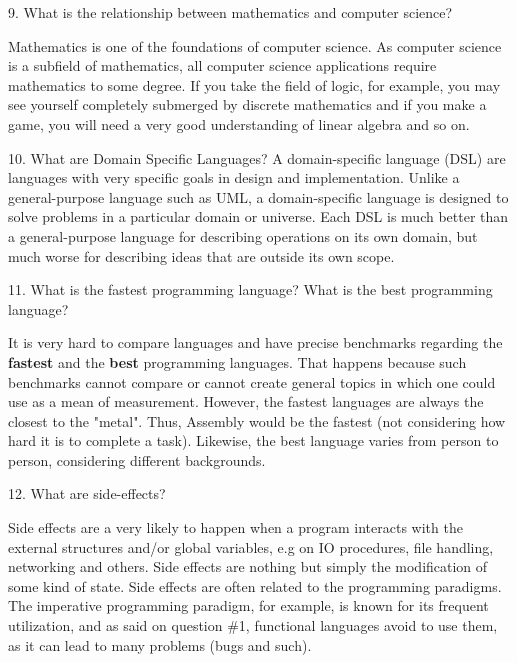\documentclass{article}
\begin{document}
9. What is the relationship between mathematics and computer science?
\newline

Mathematics is one of the foundations of computer science. As computer science is a subfield of mathematics, all computer science applications require mathematics to some degree. If you take the field of logic, for example, you may see yourself completely submerged by discrete mathematics and if you make a game, you will need a very good understanding of linear algebra and so on.
\newline

10. What are Domain Specific Languages?
\newline
A domain-specific language (DSL) are languages with very specific goals in design and implementation. Unlike a general-purpose language such as UML, a domain-specific language is designed to solve problems in a particular domain or universe. Each DSL is much better than a general-purpose language for describing operations on its own domain, but much worse for describing ideas that are outside its own scope.
\newline

11. What is the fastest programming language? What is the best programming language?
\newline

It is very hard to compare languages and have precise benchmarks regarding the \textbf{fastest} and the \textbf{best} programming languages. That happens because such benchmarks cannot compare or cannot create general topics in which one could use as a mean of measurement. However, the fastest languages are always the closest to the "metal". Thus, Assembly would be the fastest (not considering how hard it is to complete a task). Likewise, the best language varies from person to person, considering different backgrounds.
\newline

12. What are side-effects?
\newline

Side effects are a very likely to happen when a program interacts with the external structures and/or global variables, e.g on IO procedures, file handling, networking and others. Side effects are nothing but simply the modification of some kind of state. Side effects are often related to the programming paradigms. The imperative programming paradigm, for example, is known for its frequent utilization, and as said on question \#1, functional languages avoid to use them, as it can lead to many problems (bugs and such).
\newline
\end{document}
